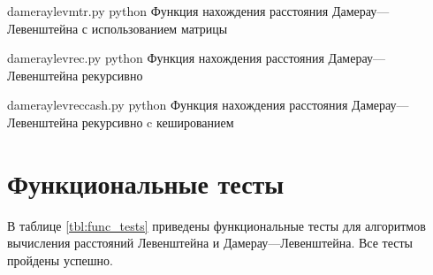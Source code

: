 \clearpage

{dameraylevmtr.py} %
{python} %
{Функция нахождения расстояния Дамерау---Левенштейна с использованием матрицы} %

\clearpage

{dameraylevrec.py} %
{python} %
{Функция нахождения расстояния Дамерау---Левенштейна рекурсивно} %

\clearpage

{dameraylevreccash.py} %
{python} %
{Функция нахождения расстояния Дамерау---Левенштейна рекурсивно c кешированием} %

\clearpage


\section{Функциональные тесты}

В таблице \ref{tbl:func_tests} приведены функциональные тесты для алгоритмов вычисления расстояний Левенштейна и Дамерау---Левенштейна. 
Все тесты пройдены успешно.

